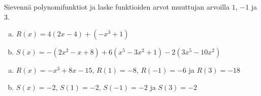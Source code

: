 \begin{tehtavasivu}
\begin{tehtava}
	Sievennä polynomifunktiot ja laske funktioiden arvot muuttujan arvoilla $1$, $-1$ ja $3$.
	\begin{enumerate}[a)]
		\item $R(x)=4(2x-4)+(-x^3+1)$
		\item $S(x)=-(2x^2-x+8)+6(x^5-3x^2+1)-2(3x^5-10x^2)$
	\end{enumerate}
	\begin{vastaus}
		\begin{enumerate}[a)]
			\item $R(x)=-x^3+8x-15$, $R(1)=-8$, $R(-1)=-6$ ja $R(3)=-18$
			\item $S(x)=-2$, $S(1)=-2$, $S(-1)=-2$ ja $S(3)=-2$
		\end{enumerate}
	\end{vastaus}
\end{tehtava}

%

\end{tehtavasivu}
